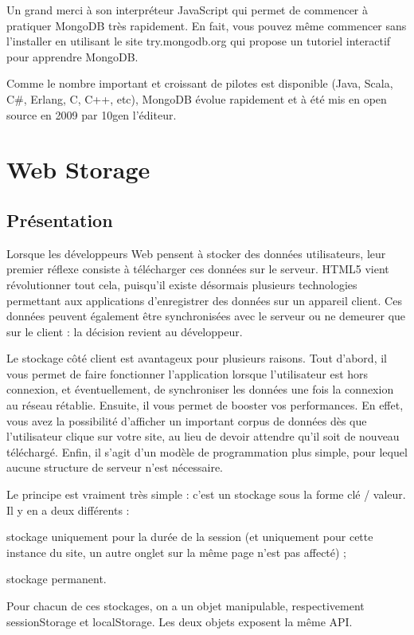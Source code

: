 Un grand merci à son interpréteur JavaScript qui permet de commencer à pratiquer MongoDB très rapidement. En fait, vous pouvez même commencer sans l’installer en utilisant le site try.mongodb.org qui propose un tutoriel interactif pour apprendre MongoDB.

Comme le nombre important et croissant de pilotes est disponible (Java, Scala, C\#, Erlang, C, C++, etc), MongoDB évolue rapidement et à été mis en open source en 2009 par 10gen l’éditeur.

\section{Web Storage}

\subsection{Présentation}

Lorsque les développeurs Web pensent à stocker des données utilisateurs, leur premier réflexe consiste à télécharger ces données sur le serveur. HTML5 vient révolutionner tout cela, puisqu'il existe désormais plusieurs technologies permettant aux applications d'enregistrer des données sur un appareil client. Ces données peuvent également être synchronisées avec le serveur ou ne demeurer que sur le client : la décision revient au développeur.

Le stockage côté client est avantageux pour plusieurs raisons. Tout d'abord, il vous permet de faire fonctionner l'application lorsque l'utilisateur est hors connexion, et éventuellement, de synchroniser les données une fois la connexion au réseau rétablie. Ensuite, il vous permet de booster vos performances. En effet, vous avez la possibilité d'afficher un important corpus de données dès que l'utilisateur clique sur votre site, au lieu de devoir attendre qu'il soit de nouveau téléchargé. Enfin, il s'agit d'un modèle de programmation plus simple, pour lequel aucune structure de serveur n'est nécessaire.


Le principe est vraiment très simple : c’est un stockage sous la forme clé / valeur. Il y en a deux différents :
\begin{list}{•}{}
  \item
  stockage uniquement pour la durée de la session (et uniquement pour cette instance du site, un autre onglet sur la même page n’est pas affecté) ;
    
  \item
  stockage permanent.

\end{list}
 Pour chacun de ces stockages, on a un objet manipulable, respectivement sessionStorage et localStorage. Les deux objets exposent la même API.
 
